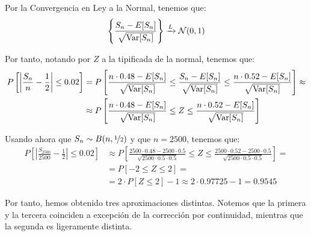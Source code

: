 \begin{ejercicio}
\begin{description}
        Por la Convergencia en Ley a la Normal, tenemos que:
        \begin{equation*}
            \left\{\frac{S_{n}-E[S_n]}{\sqrt{\operatorname{Var}[S_{n}]}}\right\}\xrightarrow{L} \mathcal{N}(0,1)
        \end{equation*}

        Por tanto, notando por $Z$ a la tipificada de la normal, tenemos que:
        \begin{align*}
            P\left[\left|\frac{S_{n}}{n} - \frac{1}{2}\right| \leq 0.02\right] &= 
            P\left[\frac{n\cdot 0.48 - E[S_{n}]}{\sqrt{\operatorname{Var}[S_{n}]}} \leq \frac{S_{n}-E[S_n]}{\sqrt{\operatorname{Var}[S_{n}]}} \leq \frac{n\cdot 0.52 - E[S_{n}]}{\sqrt{\operatorname{Var}[S_{n}]}}\right]
            \approx \\&\approx P\left[\frac{n\cdot 0.48 - E[S_{n}]}{\sqrt{\operatorname{Var}[S_{n}]}} \leq Z \leq \frac{n\cdot 0.52 - E[S_{n}]}{\sqrt{\operatorname{Var}[S_{n}]}}\right]
        \end{align*}

        Usando ahora que $S_{n} \sim B(n, \nicefrac{1}{2})$ y que $n=2500$, tenemos que:
        \begin{align*}
            P\left[\left|\frac{S_{2500}}{2500} - \frac{1}{2}\right| \leq 0.02\right] &\approx P\left[\frac{2500\cdot 0.48 - 2500\cdot 0.5}{\sqrt{2500 \cdot 0.5 \cdot 0.5}} \leq Z \leq \frac{2500\cdot 0.52 - 2500\cdot 0.5}{\sqrt{2500 \cdot 0.5 \cdot 0.5}}\right]
            =\\&= P\left[-2\leq Z \leq 2\right]
            =\\&= 2\cdot P\left[Z \leq 2\right]-1
            \approx 2\cdot 0.97725 - 1 = 0.9545
        \end{align*}
    \end{description}
    
    Por tanto, hemos obtenido tres aproximaciones distintas. Notemos que la primera y la tercera coinciden a excepción de la corrección por continuidad, mientras que la segunda es ligeramente distinta.

\end{ejercicio}

